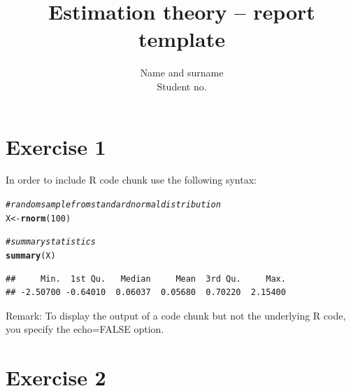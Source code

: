 \documentclass[12pt, a4paper]{article}\usepackage[]{graphicx}\usepackage[]{color}
\makeatletter
\newcommand{\hlnum}[1]{\textcolor[rgb]{0.686,0.059,0.569}{#1}}%
\newcommand{\hlcom}[1]{\textcolor[rgb]{0.678,0.584,0.686}{\textit{#1}}}%
\newcommand{\hlstd}[1]{\textcolor[rgb]{0.345,0.345,0.345}{#1}}%
\newcommand{\hlkwb}[1]{\textcolor[rgb]{0.69,0.353,0.396}{#1}}%
\newcommand{\hlkwd}[1]{\textcolor[rgb]{0.737,0.353,0.396}{\textbf{#1}}}%
\newenvironment{kframe}{%
 \def\at@end@of@kframe{}%
 \ifinner\ifhmode%
  \def\at@end@of@kframe{\end{minipage}}%
  \begin{minipage}{\columnwidth}%
 \fi\fi%
 \def\FrameCommand##1{\hskip\@totalleftmargin \hskip-\fboxsep
 \colorbox{shadecolor}{##1}\hskip-\fboxsep
     \hskip-\linewidth \hskip-\@totalleftmargin \hskip\columnwidth}%
 \MakeFramed {\advance\hsize-\width
   \@totalleftmargin\z@ \linewidth\hsize
   \@setminipage}}%
 {\par\unskip\endMakeFramed%
 \at@end@of@kframe}
\newenvironment{knitrout}{}{} %
\makeatother
\begin{document}
\title{Estimation theory -- report template}
\author{Name and surname \\ Student no.}
\maketitle
\tableofcontents 


\section{Exercise 1}

In order to include R code chunk  use the following syntax:
\begin{knitrout}
\color{fgcolor}\begin{kframe}
\begin{alltt}
\hlcom{# random sample from standard normal distribution}
\hlstd{X} \hlkwb{<-} \hlkwd{rnorm}\hlstd{(}\hlnum{100}\hlstd{)}

\hlcom{# summary statistics}
\hlkwd{summary}\hlstd{(X)}
\end{alltt}
\begin{verbatim}
##     Min.  1st Qu.   Median     Mean  3rd Qu.     Max. 
## -2.50700 -0.64010  0.06037  0.05680  0.70220  2.15400
\end{verbatim}
\end{kframe}
\end{knitrout}

Remark: To display the output of a code chunk but not the underlying R code, you specify the echo=FALSE option.

\section{Exercise 2}
\end{document}
